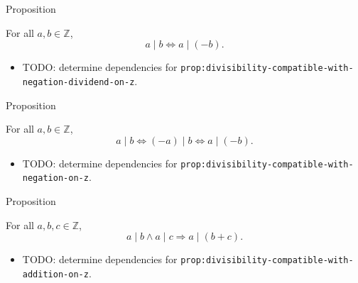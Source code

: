 \begin{propositionbox}{Proposition}
\begin{proposition}
\label{prop:divisibility-compatible-with-negation-dividend-on-z}
For all $a,b\in\mathbb{Z}$,
\[
a\mid b \Longleftrightarrow a\mid(-b).
\]
\end{proposition}
\end{propositionbox}

\begin{dependencies}
\begin{itemize}
  \item TODO: determine dependencies for \texttt{prop:divisibility-compatible-with-negation-dividend-on-z}.
\end{itemize}
\end{dependencies}

\begin{propositionbox}{Proposition}
\begin{proposition}
\label{prop:divisibility-compatible-with-negation-on-z}
For all $a,b\in\mathbb{Z}$,
\[
a\mid b \Longleftrightarrow (-a)\mid b \Longleftrightarrow a\mid(-b).
\]
\end{proposition}
\end{propositionbox}

\begin{dependencies}
\begin{itemize}
  \item TODO: determine dependencies for \texttt{prop:divisibility-compatible-with-negation-on-z}.
\end{itemize}
\end{dependencies}

\begin{propositionbox}{Proposition}
\begin{proposition}
\label{prop:divisibility-compatible-with-addition-on-z}
For all $a,b,c\in\mathbb{Z}$,
\[
a\mid b\land a\mid c \Longrightarrow a\mid(b+c).
\]
\end{proposition}
\end{propositionbox}

\begin{dependencies}
\begin{itemize}
  \item TODO: determine dependencies for \texttt{prop:divisibility-compatible-with-addition-on-z}.
\end{itemize}
\end{dependencies}

